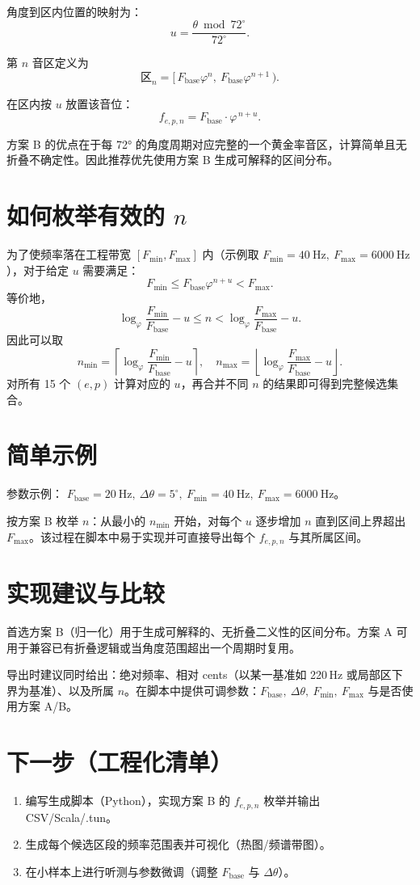 \documentclass{article}
\begin{document}
角度到区内位置的映射为：
\[
u=\frac{\theta \bmod 72^\circ}{72^\circ}.
\]

第 \(n\) 音区定义为
\[
\text{区}_n=[\,F_{\mathrm{base}}\varphi^{n},\ F_{\mathrm{base}}\varphi^{n+1}\,).
\]

在区内按 \(u\) 放置该音位：
\[
f_{e,p,n} = F_{\mathrm{base}}\cdot \varphi^{\,n+u}.
\]

方案 B 的优点在于每 72° 的角度周期对应完整的一个黄金率音区，计算简单且无折叠不确定性。因此推荐优先使用方案 B 生成可解释的区间分布。

\section*{如何枚举有效的 \(n\)}
为了使频率落在工程带宽 \([F_{\min},F_{\max}]\) 内（示例取 \(F_{\min}=40\ \mathrm{Hz},\ F_{\max}=6000\ \mathrm{Hz}\)），对于给定 \(u\) 需要满足：
\[
F_{\min}\le F_{\mathrm{base}}\varphi^{n+u}<F_{\max}.
\]
等价地，
\[
\log_{\varphi}\frac{F_{\min}}{F_{\mathrm{base}}}-u \le n < \log_{\varphi}\frac{F_{\max}}{F_{\mathrm{base}}}-u.
\]
因此可以取
\[
n_{\min}=\left\lceil \log_{\varphi}\frac{F_{\min}}{F_{\mathrm{base}}}-u \right\rceil,\quad
n_{\max}=\left\lfloor \log_{\varphi}\frac{F_{\max}}{F_{\mathrm{base}}}-u \right\rfloor.
\]
对所有 15 个 \((e,p)\) 计算对应的 \(u\)，再合并不同 \(n\) 的结果即可得到完整候选集合。

\section*{简单示例}
参数示例： \(F_{\mathrm{base}}=20\ \mathrm{Hz},\ \Delta\theta=5^\circ,\ F_{\min}=40\ \mathrm{Hz},\ F_{\max}=6000\ \mathrm{Hz}\)。

按方案 B 枚举 \(n\)：从最小的 \(n_{\min}\) 开始，对每个 \(u\) 逐步增加 \(n\) 直到区间上界超出 \(F_{\max}\)。该过程在脚本中易于实现并可直接导出每个 \(f_{e,p,n}\) 与其所属区间。

\section*{实现建议与比较}
首选方案 B（归一化）用于生成可解释的、无折叠二义性的区间分布。方案 A 可用于兼容已有折叠逻辑或当角度范围超出一个周期时复用。

导出时建议同时给出：绝对频率、相对 cents（以某一基准如 220\,Hz 或局部区下界为基准）、以及所属 \(n\)。在脚本中提供可调参数：\(F_{\mathrm{base}},\ \Delta\theta,\ F_{\min},\ F_{\max}\) 与是否使用方案 A/B。

\section*{下一步（工程化清单）}
\begin{enumerate}
  \item 编写生成脚本（Python），实现方案 B 的 \(f_{e,p,n}\) 枚举并输出 CSV/Scala/.tun。
  \item 生成每个候选区段的频率范围表并可视化（热图/频谱带图）。
  \item 在小样本上进行听测与参数微调（调整 \(F_{\mathrm{base}}\) 与 \(\Delta\theta\)）。
\end{enumerate}
\end{document}
